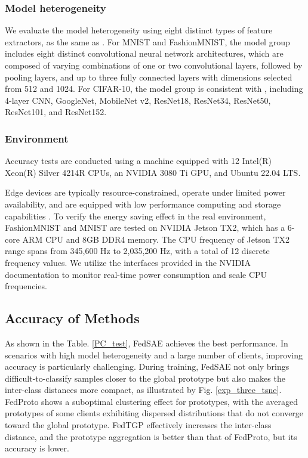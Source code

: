 \documentclass[journal]{IEEEtran}
\begin{document}
\subsubsection{Model heterogeneity}
We evaluate the model heterogeneity using eight distinct types of feature extractors, as the same as   \cite{zhang_fedtgp_2024}. For MNIST and FashionMNIST,  the model group includes eight distinct convolutional neural network architectures, which are composed of varying combinations of one or two convolutional layers, followed by pooling layers, and up to three fully connected layers with dimensions selected from 512 and 1024. For CIFAR-10, the model group is consistent with \cite{zhang_fedtgp_2024}, including 4-layer CNN, GoogleNet, MobileNet v2, ResNet18, ResNet34, ResNet50, ResNet101, and ResNet152.

\subsubsection{Environment}
Accuracy tests are conducted using a machine equipped with 12 Intel(R) Xeon(R) Silver 4214R CPUs, an NVIDIA 3080 Ti GPU, and Ubuntu 22.04 LTS.

Edge devices are typically resource-constrained, operate under limited power availability, and are equipped with low performance computing and storage capabilities \cite{jiang2020energy}. To verify the energy saving effect in the real environment, FashionMNIST and MNIST are tested on NVIDIA Jetson TX2, which has a 6-core ARM CPU and 8GB DDR4 memory. The CPU frequency of Jetson TX2 range spans from 345,600 Hz to 2,035,200 Hz, with a total of 12 discrete frequency values. We utilize the interfaces provided in the NVIDIA documentation to monitor real-time power consumption and scale CPU frequencies.


\subsection{Accuracy of Methods}
As shown in the Table. \ref{PC_test}, FedSAE achieves the best performance. In scenarios with high model heterogeneity and a large number of clients, improving accuracy is particularly challenging. During training, FedSAE not only brings difficult-to-classify samples closer to the global prototype but also makes the inter-class distances more compact, as illustrated by Fig. \ref{exp_three_tsne}. FedProto shows a suboptimal clustering effect for prototypes, with the averaged prototypes of some clients exhibiting dispersed distributions that do not converge toward the global prototype. FedTGP effectively increases the inter-class distance, and the prototype aggregation is better than that of FedProto, but its accuracy is lower.
\end{document}
